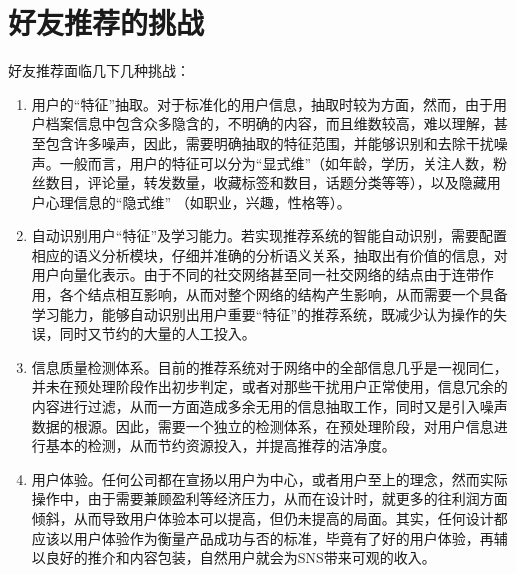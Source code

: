 \section{好友推荐的挑战}
好友推荐面临几下几种挑战：
\begin{enumerate}[（1）]
\item 用户的“特征”抽取。对于标准化的用户信息，抽取时较为方面，然而，由于用户档案信息中包含众多隐含的，不明确的内容，而且维数较高，难以理解，甚至包含许多噪声，因此，需要明确抽取的特征范围，并能够识别和去除干扰噪声。一般而言，用户的特征可以分为“显式维”（如年龄，学历，关注人数，粉丝数目，评论量，转发数量，收藏标签和数目，话题分类等等），以及隐藏用户心理信息的“隐式维”
（如职业，兴趣，性格等）。

\item 自动识别用户“特征”及学习能力。若实现推荐系统的智能自动识别，需要配置相应的语义分析模块，仔细并准确的分析语义关系，抽取出有价值的信息，对用户向量化表示。由于不同的社交网络甚至同一社交网络的结点由于连带作用，各个结点相互影响，从而对整个网络的结构产生影响，从而需要一个具备学习能力，能够自动识别出用户重要“特征”的推荐系统，既减少认为操作的失误，同时又节约的大量的人工投入。

\item 信息质量检测体系。目前的推荐系统对于网络中的全部信息几乎是一视同仁，并未在预处理阶段作出初步判定，或者对那些干扰用户正常使用，信息冗余的内容进行过滤，从而一方面造成多余无用的信息抽取工作，同时又是引入噪声数据的根源。因此，需要一个独立的检测体系，在预处理阶段，对用户信息进行基本的检测，从而节约资源投入，并提高推荐的洁净度。

\item 用户体验。任何公司都在宣扬以用户为中心，或者用户至上的理念，然而实际操作中，由于需要兼顾盈利等经济压力，从而在设计时，就更多的往利润方面倾斜，从而导致用户体验本可以提高，但仍未提高的局面。其实，任何设计都应该以用户体验作为衡量产品成功与否的标准，毕竟有了好的用户体验，再辅以良好的推介和内容包装，自然用户就会为SNS带来可观的收入。
\end{enumerate}
